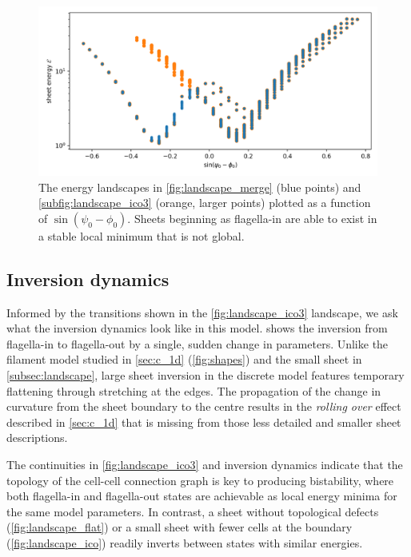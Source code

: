 \begin{figure}[bthp]
	\centering
	\includegraphics[width=\textwidth]{collapse.png}
	\caption[Energy landscape of an inverting sheet projected onto a single axis]{The energy landscapes in \cref{fig:landscape_merge} (blue points) and \cref{subfig:landscape_ico3} (orange, larger points) plotted as a function of $\sin (\psi_0 - \phi_0)$. Sheets beginning as flagella-in are able to exist in a stable local minimum that is not global.}
	\label{fig:collapse}
\end{figure}

\subsection{Inversion dynamics} \label{subsec:dynamics}

Informed by the transitions shown in the \cref{fig:landscape_ico3} landscape, we ask what the inversion dynamics look like in this model.
 shows the inversion from flagella-in to flagella-out by a single, sudden change in parameters.
Unlike the filament model studied in \cref{sec:c_1d} (\cref{fig:shapes}) and the small sheet in \cref{subsec:landscape}, large sheet inversion in the discrete model features temporary flattening through stretching at the edges.
The propagation of the change in curvature from the sheet boundary to the centre results in the \textit{rolling over} effect described in \cref{sec:c_1d} that is missing from those less detailed and smaller sheet descriptions. 

The continuities in \cref{fig:landscape_ico3} and inversion dynamics indicate that the topology of the cell-cell connection graph is key to producing bistability, where both flagella-in and flagella-out states are achievable as local energy minima for the same model parameters.
In contrast, a sheet without topological defects (\cref{fig:landscape_flat}) or a small sheet with fewer cells at the boundary (\cref{fig:landscape_ico}) readily inverts between states with similar energies.

